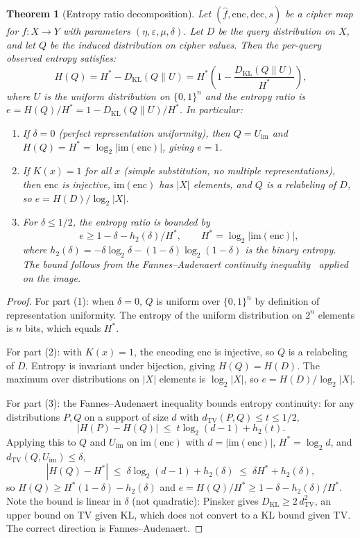 \documentclass[11pt]{article}
\theoremstyle{definition}
\theoremstyle{plain}
\newtheorem{theorem}{Theorem}[section]
\theoremstyle{remark}
\newcommand{\fhat}{\hat{f}}
\newcommand{\enc}{\mathrm{enc}}
\newcommand{\dec}{\mathrm{dec}}
\newcommand{\TV}{d_{\mathrm{TV}}}
\newcommand{\B}{\{0,1\}}
\begin{document}
\begin{theorem}[Entropy ratio decomposition]
\label{thm:entropy-decomposition}
Let $(\fhat, \enc, \dec, s)$ be a cipher map for $f : X \to Y$ with
parameters $(\eta, \varepsilon, \mu, \delta)$.  Let $D$ be the query
distribution on $X$, and let $Q$ be the induced distribution on cipher
values.  Then the per-query observed entropy satisfies:
\begin{equation}
\label{eq:entropy-decomp}
H(Q) = H^* - D_{\mathrm{KL}}(Q \| U)
      = H^* \!\left(1 - \frac{D_{\mathrm{KL}}(Q \| U)}{H^*}\right),
\end{equation}
where $U$ is the uniform distribution on $\B^n$ and the entropy ratio is
$e = H(Q)/H^* = 1 - D_{\mathrm{KL}}(Q \| U)/H^*$.  In particular:
\begin{enumerate}
\item If $\delta = 0$ (perfect representation uniformity), then
  $Q = U_{\mathrm{im}}$ and $H(Q) = H^* = \log_2|\mathrm{im}(\enc)|$,
  giving $e = 1$.
\item If $K(x) = 1$ for all $x$ (simple substitution, no multiple
  representations), then $\enc$ is injective, $\mathrm{im}(\enc)$ has
  $|X|$ elements, and $Q$ is a relabeling of $D$, so
  $e = H(D) / \log_2 |X|$.
\item For $\delta \leq 1/2$, the entropy ratio is bounded by
  \[
  e \geq 1 - \delta - h_2(\delta)/H^*,
  \qquad H^* = \log_2|\mathrm{im}(\enc)|,
  \]
  where $h_2(\delta) = -\delta\log_2\delta - (1-\delta)\log_2(1-\delta)$
  is the binary entropy.  The bound follows from the Fannes--Audenaert
  continuity inequality~\cite{fannes1973continuity,audenaert2007sharp}
  applied on the image.
\end{enumerate}
\end{theorem}

\begin{proof}
For part (1): when $\delta = 0$, $Q$ is uniform over $\B^n$ by
definition of representation uniformity.  The entropy of the uniform
distribution on $2^n$ elements is $n$ bits, which equals $H^*$.

For part (2): with $K(x) = 1$, the encoding $\enc$ is injective, so $Q$
is a relabeling of $D$.  Entropy is invariant under bijection, giving
$H(Q) = H(D)$.  The maximum over distributions on $|X|$ elements is
$\log_2 |X|$, so $e = H(D) / \log_2 |X|$.

For part (3): the Fannes--Audenaert inequality bounds entropy
continuity: for any distributions $P, Q$ on a support of size $d$ with
$\TV(P, Q) \leq t \leq 1/2$,
\[
|H(P) - H(Q)| \;\leq\; t \log_2(d - 1) + h_2(t).
\]
Applying this to $Q$ and $U_{\mathrm{im}}$ on $\mathrm{im}(\enc)$ with
$d = |\mathrm{im}(\enc)|$, $H^* = \log_2 d$, and
$\TV(Q, U_{\mathrm{im}}) \leq \delta$,
\[
|H(Q) - H^*| \;\leq\; \delta \log_2(d - 1) + h_2(\delta)
                \;\leq\; \delta H^* + h_2(\delta),
\]
so $H(Q) \geq H^*(1 - \delta) - h_2(\delta)$ and
$e = H(Q)/H^* \geq 1 - \delta - h_2(\delta)/H^*$.
Note the bound is linear in $\delta$ (not quadratic):
Pinsker gives $D_{\mathrm{KL}} \geq 2\,\TV^2$, an upper bound on TV
given KL, which does not convert to a KL bound given TV.  The correct
direction is Fannes--Audenaert.
\end{proof}
\end{document}
